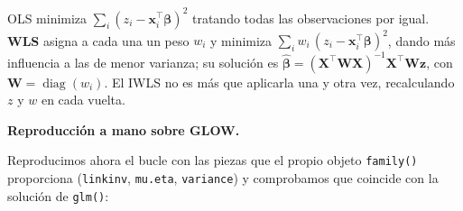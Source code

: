 \documentclass[
  letterpaper,
  DIV=11,
  numbers=noendperiod]{scrartcl}
\begin{document}
\begin{tcolorbox}[enhanced jigsaw, breakable, colframe=quarto-callout-note-color-frame, left=2mm, arc=.35mm, colbacktitle=quarto-callout-note-color!10!white, toprule=.15mm, colback=white, coltitle=black, rightrule=.15mm, opacitybacktitle=0.6, title=\textcolor{quarto-callout-note-color}{\faInfo}\hspace{0.5em}{Recordatorio: mínimos cuadrados ponderados (WLS)}, titlerule=0mm, toptitle=1mm, bottomtitle=1mm, leftrule=.75mm, bottomrule=.15mm, opacityback=0]

OLS minimiza \(\sum_i (z_i-\mathbf{x}_i^\top\boldsymbol\beta)^2\)
tratando todas las observaciones por igual. \textbf{WLS} asigna a cada
una un peso \(w_i\) y minimiza
\(\sum_i w_i\,(z_i-\mathbf{x}_i^\top\boldsymbol\beta)^2\), dando más
influencia a las de menor varianza; su solución es
\(\hat{\boldsymbol\beta}=(\mathbf{X}^\top\mathbf{W}\mathbf{X})^{-1} \mathbf{X}^\top\mathbf{W}\mathbf{z}\),
con \(\mathbf{W}=\operatorname{diag}(w_i)\). El IWLS no es más que
aplicarla una y otra vez, recalculando \(z\) y \(w\) en cada vuelta.

\end{tcolorbox}

\textbf{Reproducción a mano sobre GLOW.}

Reproducimos ahora el bucle con las piezas que el propio objeto
\texttt{family()} proporciona (\texttt{linkinv}, \texttt{mu.eta},
\texttt{variance}) y comprobamos que coincide con la solución de
\texttt{glm()}:
\end{document}
